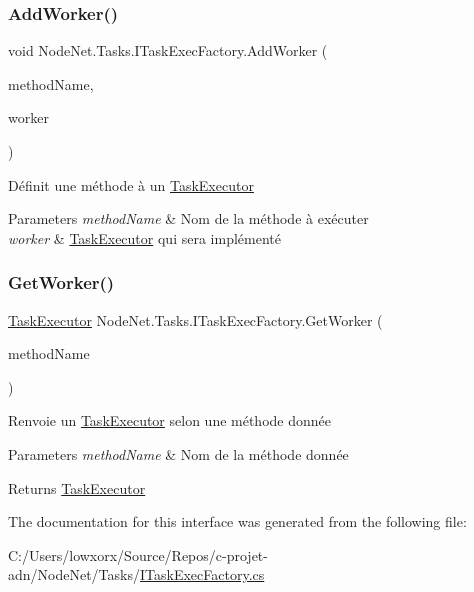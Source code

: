 \subsubsection{\texorpdfstring{Add\+Worker()}{AddWorker()}}
{\footnotesize\ttfamily void Node\+Net.\+Tasks.\+I\+Task\+Exec\+Factory.\+Add\+Worker (\begin{DoxyParamCaption}\item[{string}]{method\+Name,  }\item[{\hyperlink{class_node_net_1_1_tasks_1_1_task_executor}{Task\+Executor}}]{worker }\end{DoxyParamCaption})}



Définit une méthode à un \hyperlink{class_node_net_1_1_tasks_1_1_task_executor}{Task\+Executor} 


\begin{DoxyParams}{Parameters}
{\em method\+Name} & Nom de la méthode à exécuter\\
\hline
{\em worker} & \hyperlink{class_node_net_1_1_tasks_1_1_task_executor}{Task\+Executor} qui sera implémenté\\
\hline
\end{DoxyParams}
\mbox{\label{interface_node_net_1_1_tasks_1_1_i_task_exec_factory_a16265454dbff396835e0676dfe5b5197}} 
\subsubsection{\texorpdfstring{Get\+Worker()}{GetWorker()}}
{\footnotesize\ttfamily \hyperlink{class_node_net_1_1_tasks_1_1_task_executor}{Task\+Executor} Node\+Net.\+Tasks.\+I\+Task\+Exec\+Factory.\+Get\+Worker (\begin{DoxyParamCaption}\item[{string}]{method\+Name }\end{DoxyParamCaption})}



Renvoie un \hyperlink{class_node_net_1_1_tasks_1_1_task_executor}{Task\+Executor} selon une méthode donnée 


\begin{DoxyParams}{Parameters}
{\em method\+Name} & Nom de la méthode donnée\\
\hline
\end{DoxyParams}
\begin{DoxyReturn}{Returns}
\hyperlink{class_node_net_1_1_tasks_1_1_task_executor}{Task\+Executor}
\end{DoxyReturn}


The documentation for this interface was generated from the following file\+:\begin{DoxyCompactItemize}
\item 
C\+:/\+Users/lowxorx/\+Source/\+Repos/c-\/projet-\/adn/\+Node\+Net/\+Tasks/\hyperlink{_i_task_exec_factory_8cs}{I\+Task\+Exec\+Factory.\+cs}\end{DoxyCompactItemize}
